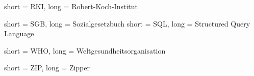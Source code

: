 		
	{	short = RKI,
		long = Robert-Koch-Institut
	}

	{	short = SGB,
		long = Sozialgesetzbuch
	}
	{	short = SQL,
		long = Structured Query Language
	}

	{	short = WHO,
		long = Weltgesundheitsorganisation
	}

	{	short = ZIP,
		long = Zipper
	}

